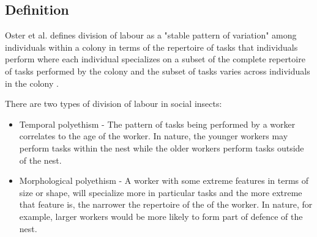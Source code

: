 \subsection{Definition}
\label{sec:second:definition}

Oster et al. defines division of labour as a "stable pattern of variation" among individuals within a colony in terms of the repertoire of tasks that individuals perform where each individual specializes on a subset of the complete repertoire of tasks performed by the colony and the subset of tasks varies across individuals in the colony \cite{oster1978caste}.  

There are two types of division of labour in social insects: 
\begin{itemize}
	\item Temporal polyethism - The pattern of tasks being performed by a worker correlates to the age of the worker. In nature, the younger workers may perform tasks within the nest while the older workers perform tasks outside of the nest.
	\item Morphological polyethism - A worker with some extreme features in terms of size or shape, will specialize more in particular tasks and the more extreme that feature is, the narrower the repertoire of the of the worker. In nature, for example, larger workers would be more likely to form part of defence of the nest. \cite{beshers2001models}
\end{itemize}



